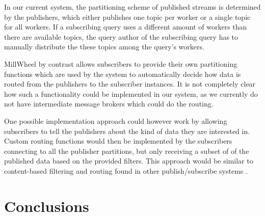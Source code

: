 In our current system, the partitioning scheme of published streams is
determined by the publishers, which either publishes one topic per worker or
a single topic for all workers. If a subscribing query uses a different amount
of workers than there are available topics, the query author of the subscribing
query has to manually distribute the these topics among the query's workers.

MillWheel by contrast allows subscribers to provide their own partitioning
functions which are used by the system to automatically decide how data is
routed from the publishers to the subscriber instances. It is not completely
clear how such a functionality could be implemented in our system, as we
currently do not have intermediate message brokers which could do the routing.

One possible implementation approach could however work by allowing subscribers
to tell the publishers about the kind of data they are interested in. Custom
routing functions would then be implemented by the subscribers connecting
to all the publisher partitions, but only receiving a subset of of the published
data based on the provided filters. This approach would be similar to
content-based filtering and routing found in other publish/subscribe systems
\cite{pubsub}.

\clearpage
\section{Conclusions}
